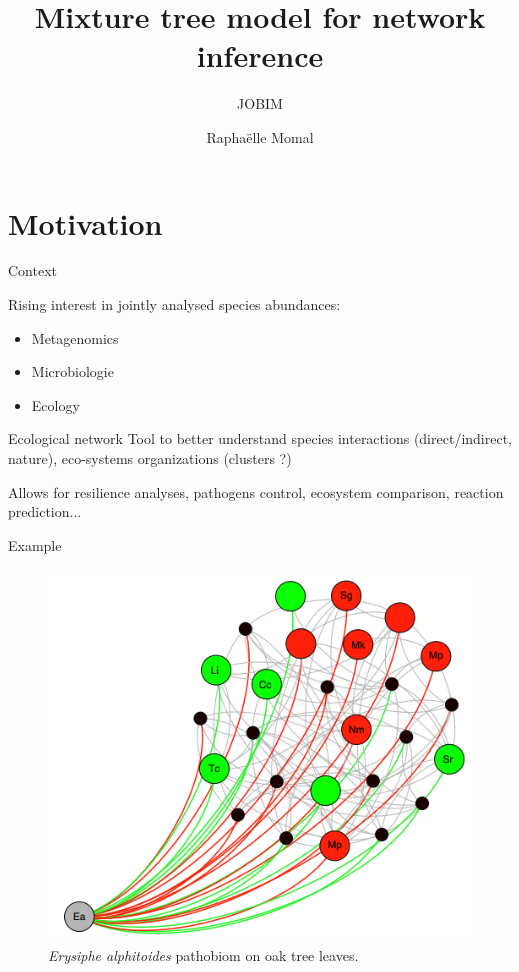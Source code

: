 \documentclass{beamer}
\title{Mixture tree model for network inference}
\subtitle{JOBIM}
\author{Raphaëlle Momal}
\institute{UMR518 AgroParis Tech/INRA}
\newcommand{\emphase}[1]{\textcolor{Complement}{#1}}
\begin{document}
\frame{\titlepage}
\begin{frame} 
	\tableofcontents[]
\end{frame}
\section{Motivation}

\begin{frame}{Context}

Rising interest in \emphase{jointly analysed }species abundances:
\begin{itemize}
	\item Metagenomics 
	\item Microbiologie
	\item Ecology
\end{itemize}

\begin{block}{Ecological network}
Tool to better understand species interactions (direct/indirect, nature), eco-systems organizations (clusters ?) 
\end{block}
Allows for resilience analyses, pathogens control, ecosystem comparison, reaction prediction...
\end{frame}
\begin{frame}{Example}
\begin{figure}[]
\centering
\includegraphics[scale=0.55]{jukush.png}
\caption{\textit{Erysiphe alphitoides} pathobiom on oak tree leaves.}
\end{figure}
\end{frame}
\end{document}
